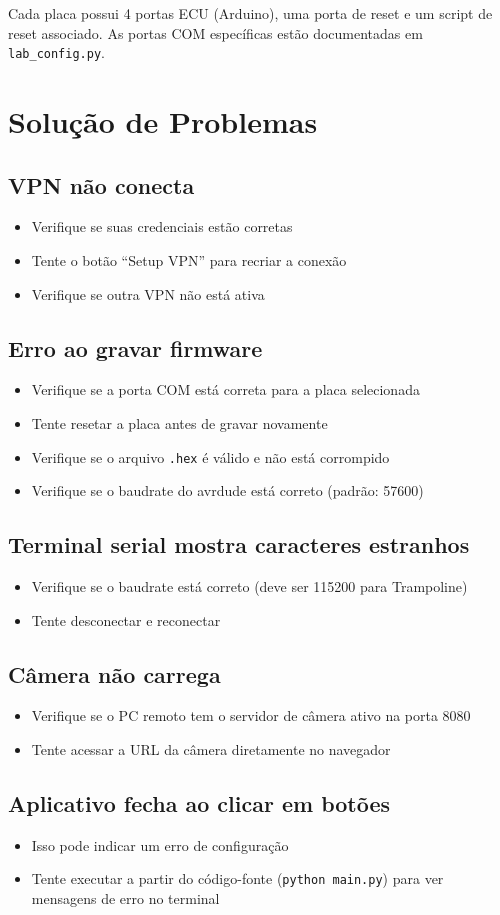\documentclass[12pt,a4paper]{article}
\begin{document}
Cada placa possui 4 portas ECU (Arduino), uma porta de reset e um script de reset associado. As portas COM específicas estão documentadas em \texttt{lab\_config.py}.

\section{Solução de Problemas}

\subsection{VPN não conecta}
\begin{itemize}[nosep]
  \item Verifique se suas credenciais estão corretas
  \item Tente o botão ``Setup VPN'' para recriar a conexão
  \item Verifique se outra VPN não está ativa
\end{itemize}

\subsection{Erro ao gravar firmware}
\begin{itemize}[nosep]
  \item Verifique se a porta COM está correta para a placa selecionada
  \item Tente resetar a placa antes de gravar novamente
  \item Verifique se o arquivo \texttt{.hex} é válido e não está corrompido
  \item Verifique se o baudrate do avrdude está correto (padrão: 57600)
\end{itemize}

\subsection{Terminal serial mostra caracteres estranhos}
\begin{itemize}[nosep]
  \item Verifique se o baudrate está correto (deve ser 115200 para Trampoline)
  \item Tente desconectar e reconectar
\end{itemize}

\subsection{Câmera não carrega}
\begin{itemize}[nosep]
  \item Verifique se o PC remoto tem o servidor de câmera ativo na porta 8080
  \item Tente acessar a URL da câmera diretamente no navegador
\end{itemize}

\subsection{Aplicativo fecha ao clicar em botões}
\begin{itemize}[nosep]
  \item Isso pode indicar um erro de configuração
  \item Tente executar a partir do código-fonte (\texttt{python main.py}) para ver mensagens de erro no terminal
\end{itemize}
\end{document}
